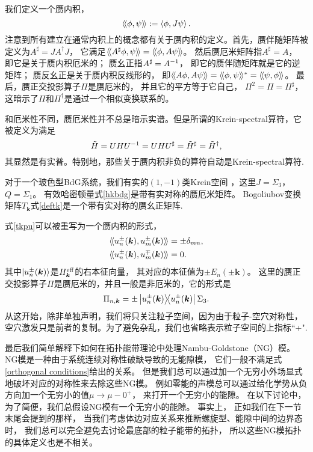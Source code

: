 我们定义一个赝内积，
\begin{equation}
	\langle\!\langle \phi,\psi \rangle\!\rangle := \expval{\phi,J \psi}. \label{defkip}
\end{equation}
注意到所有建立在通常内积上的概念都有关于赝内积的定义。首先，赝伴随矩阵被定义为$A^\sharp=J A^\dagger J$，
它满足$\langle\!\langle A^\sharp \phi,\psi \rangle\!\rangle=\langle\!\langle \phi,A\psi \rangle\!\rangle$。
然后赝厄米矩阵指$A^\sharp=A$，
即它是关于赝内积厄米的；
赝幺正指$A^\sharp=A^{-1}$，
即它的赝伴随矩阵就是它的逆矩阵；
赝反幺正是关于赝内积反线形的，
即$\langle\!\langle A\phi,A\psi \rangle\!\rangle=\langle\!\langle \phi,\psi \rangle\!\rangle^*=\langle\!\langle \psi,\phi \rangle\!\rangle$。
最后，赝正交投影算子$\Pi$是赝厄米的，
并且它的平方等于它自己，
$\Pi^2=\Pi=\Pi^\sharp$，
这暗示了$\Pi$和$\Pi^\dagger$是通过一个相似变换联系的。

和厄米性不同，赝厄米性并不总是暗示实谱。但是所谓的Krein-spectral算符，它被定义为满足
\begin{equation}
	\tilde H=UHU^{-1} =UHU^\sharp=\tilde H^\sharp =\tilde H^\dagger,\nonumber
\end{equation}
其显然是有实普。特别地，那些关于赝内积非负的算符自动是Krein-spectral算符\cite{Peano2018,Colpa1978}.

对于一个玻色型BdG系统，我们有实的$(1,-1)$类Krein空间 \cite{SchulzBaldes2016}，这里$J=\Sigma_3$，
$Q=\Sigma_1$。
有效哈密顿量式\eqref{hkbdg}是带有实对称的赝厄米矩阵。
Bogoliubov变换矩阵$T_{\boldsymbol k}$式\eqref{deftk}是一个带有实对称的赝幺正矩阵.

式\eqref{tkpu}可以被重写为一个赝内积的形式，
\begin{equation}\label{orthogonal conditions}
	\begin{split}
		\langle\!\langle u^\pm_n(\boldsymbol k),u^\pm_m(\boldsymbol k) \rangle\!\rangle &=\pm \delta_{mn},\\
		\langle\!\langle u^\pm_n(\boldsymbol k),u^\mp_m(\boldsymbol k) \rangle\!\rangle &=0.
	\end{split}
\end{equation}
其中$\ket{u^\pm_n(\boldsymbol k)}$是$H^{\text{eff}}_{\boldsymbol k}$的右本征向量，
其对应的本征值为$\pm E_n(\pm \boldsymbol k)$。
这里的赝正交投影算子$\Pi$是赝厄米的，并且一般是非厄米的，它的形式是
\begin{equation}\label{projop}
	\Pi_{n,\boldsymbol k}=\pm \ketbra{u^\pm_n(\boldsymbol k)}{u^\pm_n(\boldsymbol k)}\Sigma_3.
\end{equation}
从这开始，除非单独声明，我们将只关注粒子空间，因为由于粒子-空穴对称性，空穴激发只是前者的复制。为了避免杂乱，我们也省略表示粒子空间的上指标``+".

最后我们简单解释下如何在拓扑能带理论中处理Nambu-Goldstone（NG）模。
NG模是一种由于系统连续对称性破缺导致的无能隙模，
它们一般不满足式\eqref{orthogonal conditions}给出的关系\cite{Takahashi2015,Watanabe2020}。
但是我们总可以通过加一个无穷小外场显式地破坏对应的对称性来去除这些NG模。
例如零能的声模总可以通过给化学势从负方向加一个无穷小的值$\mu\rightarrow \mu-0^+$，
来打开一个无穷小的能隙。
在以下讨论中，为了简便，我们总假设NG模有一个无穷小的能隙。
事实上，
正如我们在下一节末尾会提到的那样，
当我们考虑体边对应关系来推断螺旋型、能隙中间的边界态时，
我们总可以完全避免去讨论最底部的粒子能带的拓扑，
所以这些NG模拓扑的具体定义也是不相关\cite{Furukawa2015}。

